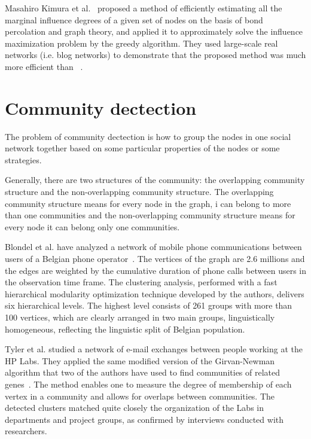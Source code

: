 Masahiro Kimura et al.~\cite{kimura2010extracting} proposed a method
of efficiently estimating all the marginal influence degrees of a
given set of nodes on the basis of bond percolation and graph theory,
and applied it to approximately solve the influence maximization
problem by the greedy algorithm. They used large-scale real
networks (i.e. blog networks) to demonstrate that the proposed
 method was much more efficient than ~\cite{kempe2003maximizing}.

\section{Community dectection}

The problem of community dectection is how to group the nodes in one social network together based on some particular properties of the nodes or some strategies.

Generally, there are two structures of the community: the overlapping community structure and the non-overlapping community structure. The overlapping community structure means for every node in the graph, i can belong to more than one communities and the non-overlapping community structure means for every node it can belong only one communities. 

Blondel et al. have analyzed a network of mobile phone communications between users of a Belgian phone operator~\cite{blondel2008fast}.
The vertices of the graph are 2.6 millions and the edges are weighted by the cumulative duration of phone calls between users in the observation time frame. The clustering analysis, performed with a fast hierarchical modularity optimization technique
developed by the authors, delivers six hierarchical levels. The highest level consists of 261 groups
with more than 100 vertices, which are clearly arranged in two main groups, linguistically homogeneous, reflecting the
linguistic split of Belgian population. 

Tyler et al.\cite{tyler2005mail} studied a network of e-mail exchanges between people
working at the HP Labs. They applied the same modified version of the Girvan-Newman algorithm that two of the authors have used
to find communities of related genes~\cite{wilkinson2004method}. The method enables one to measure the degree of membership
of each vertex in a community and allows for overlaps between communities. The detected clusters matched quite closely
the organization of the Labs in departments and project groups, as
confirmed by interviews conducted with researchers.

